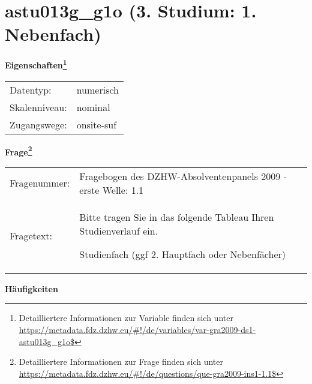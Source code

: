 
    \setcounter{footnote}{0}

    \vspace*{-1.8cm}
	\section{astu013g\_g1o (3. Studium: 1. Nebenfach)}
	\label{section:astu013g_g1o}



    \vspace*{0.5cm}
    \noindent\textbf{Eigenschaften\footnote{Detailliertere Informationen zur Variable finden sich unter
		\url{https://metadata.fdz.dzhw.eu/\#!/de/variables/var-gra2009-ds1-astu013g_g1o$}}}\\
	\begin{tabularx}{\hsize}{@{}lX}
	Datentyp: & numerisch \\
	Skalenniveau: & nominal \\
	Zugangswege: &
	  onsite-suf
 \\
    \end{tabularx}



				\vspace*{0.5cm}
                \noindent\textbf{Frage\footnote{Detailliertere Informationen zur Frage finden sich unter
		              \url{https://metadata.fdz.dzhw.eu/\#!/de/questions/que-gra2009-ins1-1.1$}}}\\
				\begin{tabularx}{\hsize}{@{}lX}
					Fragenummer: &
					  Fragebogen des DZHW-Absolventenpanels 2009 - erste Welle:
					  1.1
 \\
					Fragetext: & Bitte tragen Sie in das folgende Tableau Ihren Studienverlauf ein.\par  Studienfach (ggf 2. Hauptfach oder Nebenfächer) \\
				\end{tabularx}





        		\vspace*{0.5cm}
                \noindent\textbf{Häufigkeiten}

